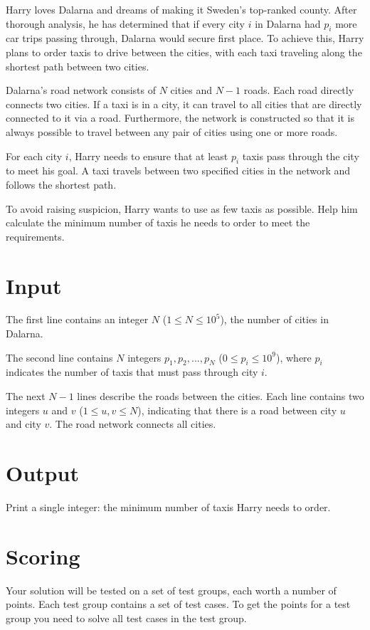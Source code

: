 
\noindent
Harry loves Dalarna and dreams of making it Sweden's top-ranked county. 
After thorough analysis, he has determined that if every city $i$ in Dalarna had $p_i$ more car trips passing through, 
Dalarna would secure first place. To achieve this, Harry plans to order taxis to drive between the cities, 
with each taxi traveling along the shortest path between two cities.

Dalarna's road network consists of $N$ cities and $N-1$ roads. Each road directly connects two cities. 
If a taxi is in a city, it can travel to all cities that are directly connected to it via a road. Furthermore, 
the network is constructed so that it is always possible to travel between any pair of cities using one or more roads.

For each city $i$, Harry needs to ensure that at least $p_i$ taxis pass through the city to meet his goal. 
A taxi travels between two specified cities in the network and follows the shortest path.

To avoid raising suspicion, Harry wants to use as few taxis as possible. 
Help him calculate the minimum number of taxis he needs to order to meet the requirements.

\section*{Input}
The first line contains an integer $N$ ($1 \leq N \leq 10^5$), the number of cities in Dalarna.

The second line contains $N$ integers $p_1, p_2, ..., p_N$ ($0 \leq p_i \leq 10^9$), where $p_i$
indicates the number of taxis that must pass through city $i$.

The next $N-1$ lines describe the roads between the cities. Each line contains two integers $u$ and $v$
($1 \leq u, v \leq N$), indicating that there is a road between city $u$ and city $v$.
The road network connects all cities.

\section*{Output}
Print a single integer: the minimum number of taxis Harry needs to order.

\section*{Scoring}
Your solution will be tested on a set of test groups, each worth a number of points. Each test group contains
a set of test cases. To get the points for a test group you need to solve all test cases in the test group.

